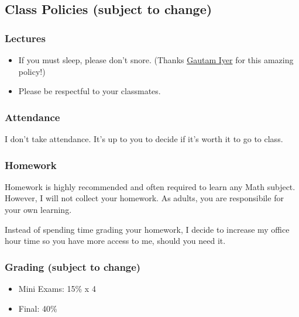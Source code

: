 \documentclass[
]{article}
\providecommand{\tightlist}{%
  \setlength{\itemsep}{0pt}\setlength{\parskip}{0pt}}
\begin{document}
\subsection*{Class Policies (subject to change)}\label{class-policies-subject-to-change}

\subsubsection*{Lectures}\label{lectures}

\begin{itemize}
\tightlist
\item
  If you must sleep, please don't snore. (Thanks \href{https://www.math.cmu.edu/~gautam/}{Gautam Iyer} for this amazing policy!)
\item
  Please be respectful to your classmates.
\end{itemize}

\subsubsection*{Attendance}\label{attendance}

I don't take attendance. It's up to you to decide if it's worth it to go to
class.

\subsubsection*{Homework}\label{homework}

Homework is highly recommended and often required to learn any Math
subject. However, I will not collect your homework.
As adults, you are responsibile for your own learning.

Instead of spending time grading your homework, I decide to
increase my office hour time so you have more access to me,
should you need it.

\subsubsection*{Grading (subject to change)}\label{grading-subject-to-change}

\begin{itemize}
\tightlist
\item
  Mini Exams: 15\% x 4
\item
  Final: 40\%
\end{itemize}
\end{document}
